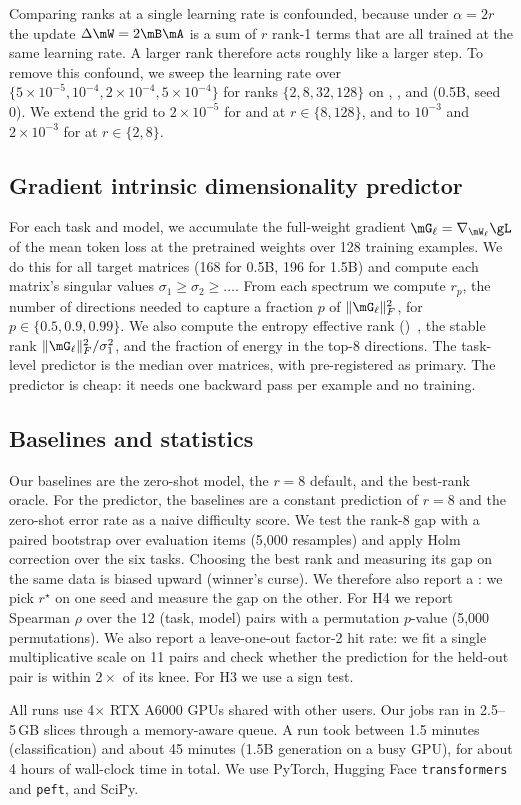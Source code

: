 Comparing ranks at a single learning rate is confounded, because under $\alpha=2r$ the update $\Delta\mW = 2\mB\mA$ is a sum of $r$ rank-1 terms that are all trained at the same learning rate. A larger rank therefore acts roughly like a larger step. To remove this confound, we sweep the learning rate over $\{5\times10^{-5}, 10^{-4}, 2\times10^{-4}, 5\times10^{-4}\}$ for ranks $\{2,8,32,128\}$ on \code, \gsm, and \emotion (0.5B, seed 0). We extend the grid to $2\times10^{-5}$ for \gsm and \code at $r\in\{8,128\}$, and to $10^{-3}$ and $2\times10^{-3}$ for \emotion at $r\in\{2,8\}$.

\subsection{Gradient intrinsic dimensionality predictor}
For each task and model, we accumulate the full-weight gradient $\mG_\ell = \nabla_{\mW_\ell}\gL$ of the mean token loss at the pretrained weights over 128 training examples. We do this for all target matrices (168 for 0.5B, 196 for 1.5B) and compute each matrix's singular values $\sigma_1 \geq \sigma_2 \geq \dots$. From each spectrum we compute $r_{p}$, the number of directions needed to capture a fraction $p$ of $\|\mG_\ell\|_F^2$, for $p\in\{0.5, 0.9, 0.99\}$. We also compute the entropy effective rank (\erank)~\citep{roy2007effective}, the stable rank $\|\mG_\ell\|_F^2/\sigma_1^2$, and the fraction of energy in the top-8 directions. The task-level predictor is the median over matrices, with \rninety pre-registered as primary. The predictor is cheap: it needs one backward pass per example and no training.

\subsection{Baselines and statistics}
Our baselines are the zero-shot model, the $r{=}8$ default, and the best-rank oracle. For the predictor, the baselines are a constant prediction of $r{=}8$ and the zero-shot error rate as a naive difficulty score. We test the rank-8 gap with a paired bootstrap over evaluation items (5,000 resamples) and apply Holm correction over the six tasks. Choosing the best rank and measuring its gap on the same data is biased upward (winner's curse). We therefore also report a : we pick $r^\star$ on one seed and measure the gap on the other. For H4 we report Spearman $\rho$ over the 12 (task, model) pairs with a permutation $p$-value (5,000 permutations). We also report a leave-one-out factor-2 hit rate: we fit a single multiplicative scale on 11 pairs and check whether the prediction for the held-out pair is within $2\times$ of its knee. For H3 we use a sign test.

All runs use 4$\times$ RTX A6000 GPUs shared with other users. Our jobs ran in 2.5--5\,GB slices through a memory-aware queue. A run took between 1.5 minutes (classification) and about 45 minutes (1.5B generation on a busy GPU), for about 4 hours of wall-clock time in total. We use PyTorch, Hugging Face \texttt{transformers} and \texttt{peft}, and SciPy.
